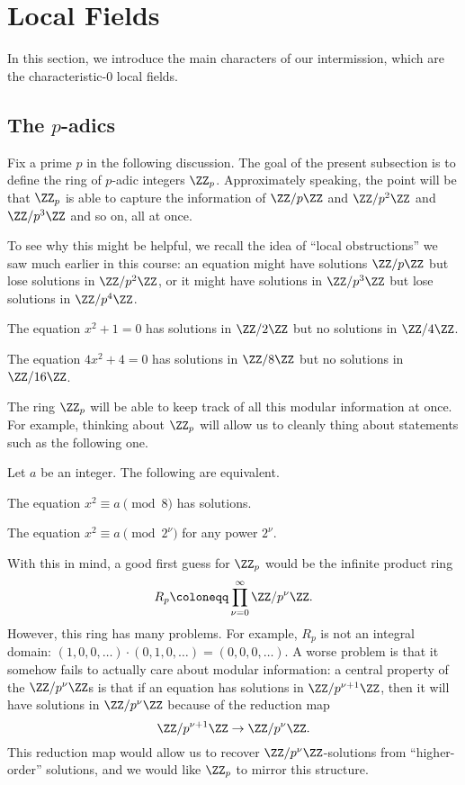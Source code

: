 \documentclass[../notes.tex]{subfiles}
\begin{document}
\section{Local Fields}

In this section, we introduce the main characters of our intermission, which are the characteristic-$0$ local fields.

\subsection{The \texorpdfstring{$p$}{ p}-adics}
Fix a prime $p$ in the following discussion. The goal of the present subsection is to define the ring of $p$-adic integers $\ZZ_p$. Approximately speaking, the point will be that $\ZZ_p$ is able to capture the information of $\ZZ/p\ZZ$ and $\ZZ/p^2\ZZ$ and $\ZZ/p^3\ZZ$ and so on, all at once.

To see why this might be helpful, we recall the idea of ``local obstructions'' we saw much earlier in this course: an equation might have solutions $\ZZ/p\ZZ$ but lose solutions in $\ZZ/p^2\ZZ$, or it might have solutions in $\ZZ/p^3\ZZ$ but lose solutions in $\ZZ/p^4\ZZ$.
\begin{example}
	The equation $x^2+1=0$ has solutions in $\ZZ/2\ZZ$ but no solutions in $\ZZ/4\ZZ$.
\end{example}
\begin{example}
	The equation $4x^2+4=0$ has solutions in $\ZZ/8\ZZ$ but no solutions in $\ZZ/16\ZZ$.
\end{example}
The ring $\ZZ_p$ will be able to keep track of all this modular information at once. For example, thinking about $\ZZ_p$ will allow us to cleanly thing about statements such as the following one.
\begin{proposition}
	Let $a$ be an integer. The following are equivalent.
	\begin{listalph}
		\item The equation $x^2\equiv a\pmod 8$ has solutions.
		\item The equation $x^2\equiv a\pmod{2^\nu}$ for any power $2^\nu$.
	\end{listalph}
\end{proposition}
With this in mind, a good first guess for $\ZZ_p$ would be the infinite product ring
\[R_p\coloneqq\prod_{\nu=0}^\infty\ZZ/p^\nu\ZZ.\]
However, this ring has many problems. For example, $R_p$ is not an integral domain: $(1,0,0,\ldots)\cdot(0,1,0,\ldots)=(0,0,0,\ldots)$. A worse problem is that it somehow fails to actually care about modular information: a central property of the $\ZZ/p^\nu\ZZ$s is that if an equation has solutions in $\ZZ/p^{\nu+1}\ZZ$, then it will have solutions in $\ZZ/p^\nu\ZZ$ because of the reduction map
\begin{equation}
	\ZZ/p^{\nu+1}\ZZ\to\ZZ/p^\nu\ZZ. \label{eq:zpz-proj}
\end{equation}
This reduction map would allow us to recover $\ZZ/p^\nu\ZZ$-solutions from ``higher-order'' solutions, and we would like $\ZZ_p$ to mirror this structure.
\end{document}
